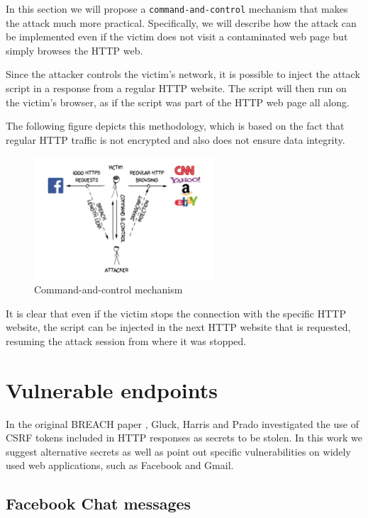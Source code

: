 In this section we will propose a \texttt{command-and-control} mechanism that
makes the attack much more practical. Specifically, we will describe how the
attack can be implemented even if the victim does not visit a contaminated web
page but simply browses the HTTP web.

Since the attacker controls the victim's network, it is possible to inject the
attack script in a response from a regular HTTP website. The script will then
run on the victim's browser, as if the script was part of the HTTP web page all
along.

The following figure depicts this methodology, which is based on the fact that
regular HTTP traffic is not encrypted and also does not ensure data integrity.

\begin{figure}[h] \caption{Command-and-control mechanism} \centering
\includegraphics[width=0.6\textwidth]{diagrams/breach_mitm.png}\end{figure}

It is clear that even if the victim stops the connection with the specific HTTP
website, the script can be injected in the next HTTP website that is requested,
resuming the attack session from where it was stopped.

\section{Vulnerable endpoints}\label{sec:vulnerabilities}

In the original BREACH paper \cite{breach}, Gluck, Harris and Prado investigated
the use of CSRF tokens included in HTTP responses as secrets to be stolen.
In this work we suggest alternative secrets as well as point out specific
vulnerabilities on widely used web applications, such as Facebook and Gmail.

\subsection{Facebook Chat messages}\label{subsec:fb}

